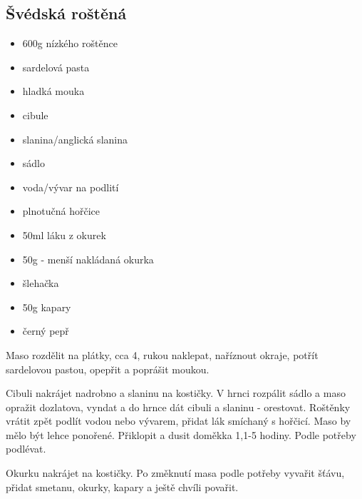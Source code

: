 \documentclass[10pt,a4paper]{article}
\newenvironment{myitemize}
{ \begin{itemize}
    \setlength{\itemsep}{0pt}
    \setlength{\parskip}{0pt}
    \setlength{\parsep}{0pt}     }
{ \end{itemize}                  }
\begin{document}
\subsection{Švédská roštěná}
\begin{minipage}[t]{0,5\textwidth}
\begin{myitemize} 
\item 600g nízkého roštěnce
\item sardelová pasta
\item hladká mouka
\item cibule
\item slanina/anglická slanina
\item sádlo
\item voda/vývar na podlití
\item plnotučná hořčice
\item 50ml láku z okurek
\item 50g - menší nakládaná okurka
\item šlehačka
\item 50g kapary
\item černý pepř
\end{myitemize}
\end{minipage}
\begin{minipage}[t]{0,5\textwidth}
Maso rozdělit na plátky, cca 4, rukou naklepat, naříznout okraje, potřít sardelovou pastou, opepřit a poprášit moukou.

Cibuli nakrájet nadrobno a slaninu na kostičky. V hrnci rozpálit sádlo a maso opražit dozlatova, vyndat a do hrnce dát cibuli a slaninu - orestovat. Roštěnky vrátit zpět podlít vodou nebo vývarem, přidat lák smíchaný s hořčicí. Maso by mělo být lehce ponořené. Přiklopit a dusit doměkka 1,1-5 hodiny. Podle potřeby podlévat.

Okurku nakrájet na kostičky. Po změknutí masa podle potřeby vyvařit šťávu, přidat smetanu, okurky, kapary a ještě chvíli povařit.
\end{minipage}
\end{document}

